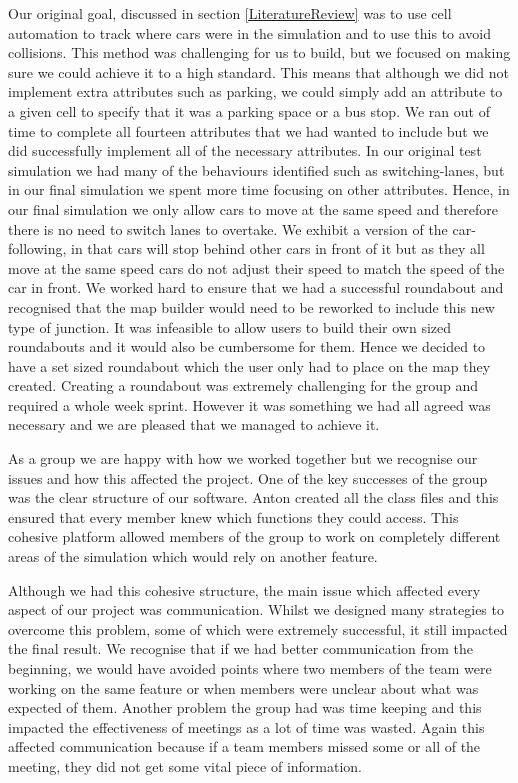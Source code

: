 \documentclass{article}
\begin{document}
	Our original goal, discussed in section \ref{LiteratureReview} was to use cell automation to track where cars were in the simulation and to use this to avoid collisions. This method was challenging for us to build, but we focused on making sure we could achieve it to a high standard. This means that although we did not implement extra attributes such as parking, we could simply add an attribute to a given cell to specify that it was a parking space or a bus stop. We ran out of time to complete all fourteen attributes that we had wanted to include but we did successfully implement all of the necessary attributes. In our original test simulation we had many of the behaviours identified \cite{ehlert2001microscopic} such as switching-lanes, but in our final simulation we spent more time focusing on other attributes. Hence, in our final simulation we only allow cars to move at the same speed and therefore there is no need to switch lanes to overtake. We exhibit a version of the car-following, in that cars will stop behind other cars in front of it but as they all move at the same speed cars do not adjust their speed to match the speed of the car in front. We worked hard to ensure that we had a successful roundabout and recognised that the map builder would need to be reworked to include this new type of junction. It was infeasible to allow users to build their own sized roundabouts and it would also be cumbersome for them. Hence we decided to have a set sized roundabout which the user only had to place on the map they created. Creating a roundabout was extremely challenging for the group and required a whole week sprint. However it was something we had all agreed was necessary and we are pleased that we managed to achieve it.
	
	As a group we are happy with how we worked together but we recognise our issues and how this affected the project. One of the key successes of the group was the clear structure of our software. Anton created all the class files and this ensured that every member knew which functions they could access. This cohesive platform allowed members of the group to work on completely different areas of the simulation which would rely on another feature.
	
	 Although we had this cohesive structure, the main issue which affected every aspect of our project was communication. Whilst we designed many strategies to overcome this problem, some of which were extremely successful, it still impacted the final result. We recognise that if we had better communication from the beginning, we would have avoided points where two members of the team were working on the same feature or when members were unclear about what was expected of them. Another problem the group had was time keeping and this impacted the effectiveness of meetings as a lot of time was wasted. Again this affected communication because if a team members missed some or all of the meeting, they did not get some vital piece of information.   
	 
\end{document}
